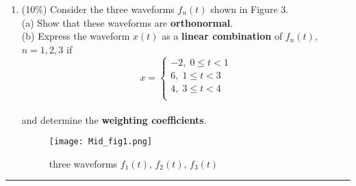 \documentclass[a4paper,12pt]{article}
\begin{document}
\begin{enumerate}
        \item (10\%) 
            Consider the three waveforms $f_n(t)$ shown in Figure 3. \\ 
            (a) Show that these waveforms are \textbf{orthonormal}. \\ 
            (b) Express the waveform $x(t)$  as a \textbf{linear combination} of $f_n(t)$, $n = 1, 2, 3$ if 
            $$x = \left\{ 
            \begin{aligned}
                -2, \; 0 \leq t < 1 \\
                 6, \; 1 \leq t < 3 \\ 
                 4, \; 3 \leq t < 4 \\
            \end{aligned}
            \right.
            $$ \\
            and determine the \textbf{weighting coefficients}.
            \begin{figure}[h]
            	\centering
            	\texttt{[image: Mid\_fig1.png]}
            	\caption{three waveforms $f_1(t)$, $f_2(t)$, $f_3(t)$}
            \end{figure}
    \end{enumerate}
    \rule{\textwidth}{0.4pt}
\end{document}
